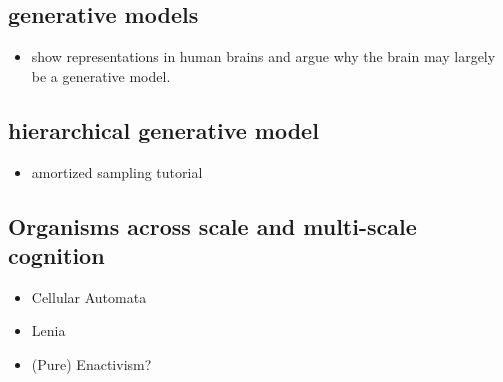 \subsection{generative models}

\begin{itemize}
    \item show representations in human brains and argue why the brain may largely be a generative model. 
\end{itemize}



\subsection{hierarchical generative model}
\begin{itemize}
    \item amortized sampling tutorial
\end{itemize}

\subsection{Organisms across scale and multi-scale cognition}

\begin{itemize}
    \item Cellular Automata
    \item Lenia
    \item (Pure) Enactivism?
\end{itemize}


